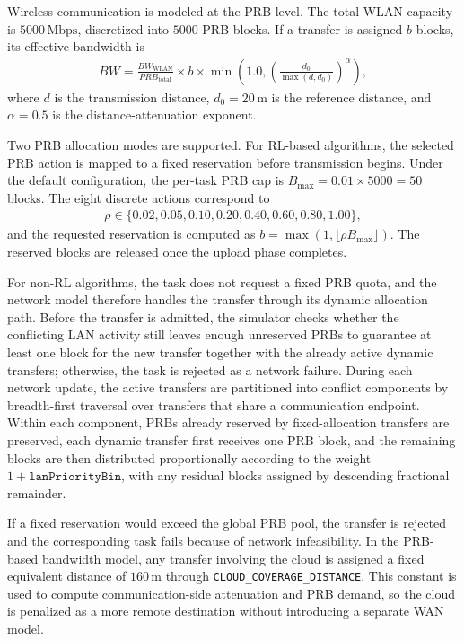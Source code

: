 Wireless communication is modeled at the PRB level. The total WLAN capacity is \(5000\,\mathrm{Mbps}\), discretized into \(5000\) PRB blocks. If a transfer is assigned \(b\) blocks, its effective bandwidth is
\begin{align}
BW = \frac{BW_{\mathrm{WLAN}}}{PRB_{\mathrm{total}}} \times b \times
\min \left(1.0, \left(\frac{d_0}{\max(d, d_0)}\right)^\alpha \right),
\label{eq:bandwidth-prb}
\end{align}
where \(d\) is the transmission distance, \(d_0 = 20\,\mathrm{m}\) is the reference distance, and \(\alpha = 0.5\) is the distance-attenuation exponent.

Two PRB allocation modes are supported. For RL-based algorithms, the selected PRB action is mapped to a fixed reservation before transmission begins. Under the default configuration, the per-task PRB cap is \(B_{\max} = 0.01 \times 5000 = 50\) blocks. The eight discrete actions correspond to
\begin{align*}
\rho \in \{0.02, 0.05, 0.10, 0.20, 0.40, 0.60, 0.80, 1.00\},
\end{align*}
and the requested reservation is computed as \(b = \max(1, \lfloor \rho B_{\max} \rfloor)\). The reserved blocks are released once the upload phase completes. 

For non-RL algorithms, the task does not request a fixed PRB quota, and the network model therefore handles the transfer through its dynamic allocation path. Before the transfer is admitted, the simulator checks whether the conflicting LAN activity still leaves enough unreserved PRBs to guarantee at least one block for the new transfer together with the already active dynamic transfers; otherwise, the task is rejected as a network failure. During each network update, the active transfers are partitioned into conflict components by breadth-first traversal over transfers that share a communication endpoint. Within each component, PRBs already reserved by fixed-allocation transfers are preserved, each dynamic transfer first receives one PRB block, and the remaining blocks are then distributed proportionally according to the weight \(1 + \texttt{lanPriorityBin}\), with any residual blocks assigned by descending fractional remainder.

If a fixed reservation would exceed the global PRB pool, the transfer is rejected and the corresponding task fails because of network infeasibility. In the PRB-based bandwidth model, any transfer involving the cloud is assigned a fixed equivalent distance of \(160\,\mathrm{m}\) through \texttt{CLOUD\_COVERAGE\_DISTANCE}. This constant is used to compute communication-side attenuation and PRB demand, so the cloud is penalized as a more remote destination without introducing a separate WAN model.

